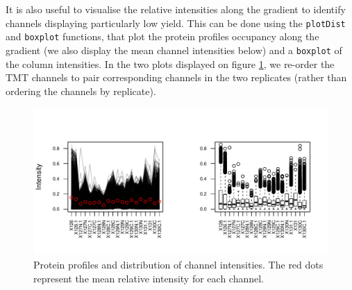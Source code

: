 It is also useful to visualise the relative intensities along the
gradient to identify channels displaying particularly low yield. This
can be done using the \texttt{plotDist} and \texttt{boxplot}
functions, that plot the protein profiles occupancy along the gradient
(we also display the mean channel intensities below) and a
\texttt{boxplot} of the column intensities.  In the two plots
displayed on figure \ref{fig:qcbx}, we re-order the TMT channels to
pair corresponding channels in the two replicates (rather than
ordering the channels by replicate).

\begin{figure}[!ht]
  \centering
\begin{knitrout}
\color{fgcolor}\begin{kframe}
\begin{alltt}
\hlstd{(} \hlstd{=} \hlstd{(}\hlstd{,} \hlstd{),} 
     \hlstd{=} \hlstd{,}         
     \hlstd{=} \hlstd{)}   
 \hlkwb{<-} \hlopt{$}
  \hlstd{=} \hlstd{,}  \hlstd{=} \hlstd{)}
\hlstd{(}\hlstd{(}  \hlstd{=} \hlstd{,}  \hlstd{=} \hlstd{)}
\hlstd{(}
\end{alltt}
\end{kframe}
\includegraphics[width=\textwidth]{figure/qcbx-1} 

\end{knitrout}
\caption{Protein profiles and distribution of channel intensities. The
  red dots represent the mean relative intensity for each channel. }
  \label{fig:qcbx}
\end{figure}

